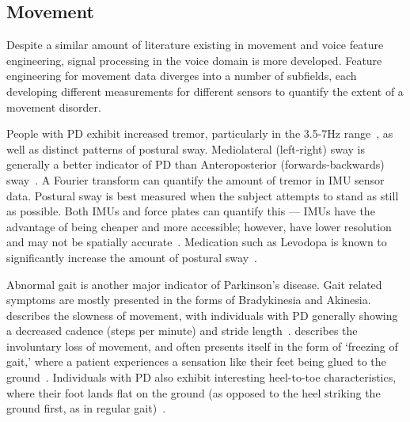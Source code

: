 \documentclass[12pt, twoside]{book}
\renewcommand\emph[1]{\textit{\color{USred}{#1}}}
\begin{document}
\subsection{Movement}\label{movementfeatures}
Despite a similar amount of literature existing in movement and voice feature engineering, signal processing in the voice domain is more developed. Feature engineering for movement data diverges into a number of subfields, each developing different measurements for different sensors to quantify the extent of a movement disorder. %

People with PD exhibit increased tremor, particularly in the 3.5-7Hz range~\cite{duval2004detection}, as well as distinct patterns of postural sway. Mediolateral (left-right) sway is generally a better indicator of PD than Anteroposterior (forwards-backwards) sway~\cite{posturalswaylongitudinal}. A Fourier transform can quantify the amount of tremor in IMU sensor data. Postural sway is best measured when the subject attempts to stand as still as possible. Both IMUs and force plates can quantify this --- IMUs have the advantage of being cheaper and more accessible; however, have lower resolution and may not be spatially accurate~\cite{palmerini2011tremor}.  Medication such as Levodopa is known to significantly increase the amount of postural sway~\cite{posturalswaylongitudinal}.





 
Abnormal gait is another major indicator of Parkinson's disease. Gait related symptoms are mostly presented in the forms of Bradykinesia and Akinesia. \emph{Bradykinesia} describes the slowness of movement, with individuals with PD generally showing a decreased cadence (steps per minute) and stride length~\cite{esser2011assessment}. \emph{Akinesia} describes the involuntary loss of movement, and often presents itself in the form of `freezing of gait,' where a patient experiences a sensation like their feet being glued to the ground~\cite{giladi1992motor}. Individuals with PD also exhibit interesting heel-to-toe characteristics, where their foot lands flat on the ground (as opposed to the heel striking the ground first, as in regular gait)~\cite{heeltotoe, roiz2010gait}.
\end{document}
